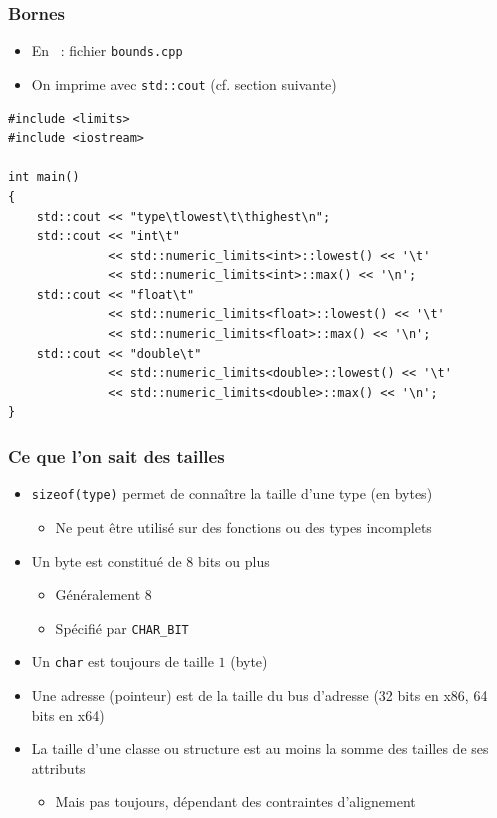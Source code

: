 \begin{frame}[containsverbatim]
\frametitle{Bornes}
\begin{itemize}
\item En \cpp\ : fichier \texttt{bounds.cpp}
\item On imprime avec \texttt{std::cout} (cf. section suivante)
\end{itemize}
\begin{lstlisting}
#include <limits>
#include <iostream>
 
int main() 
{
    std::cout << "type\tlowest\t\thighest\n";
    std::cout << "int\t"
              << std::numeric_limits<int>::lowest() << '\t'
              << std::numeric_limits<int>::max() << '\n';
    std::cout << "float\t"
              << std::numeric_limits<float>::lowest() << '\t'
              << std::numeric_limits<float>::max() << '\n';
    std::cout << "double\t"
              << std::numeric_limits<double>::lowest() << '\t'
              << std::numeric_limits<double>::max() << '\n';
}
\end{lstlisting}
\end{frame}

\begin{frame}
\frametitle{Ce que l'on sait des tailles}
\begin{itemize}[<+->]
\item \lstinline|sizeof(type)| permet de connaître la taille d'une type (en bytes)
	\begin{itemize}
	\item Ne peut être utilisé sur des fonctions ou des types incomplets
	\end{itemize}
\item Un byte est constitué de $8$ bits ou plus
	\begin{itemize}
	\item Généralement $8$
	\item Spécifié par \texttt{CHAR\_BIT}
	\end{itemize}
\item Un \lstinline|char| est toujours de taille $1$ (byte)
\item Une adresse (pointeur) est de la taille du bus d'adresse (32 bits en x86, 64 bits en x64)
\item La taille d'une classe ou structure est au moins la somme des tailles de ses attributs
	\begin{itemize}
	\item Mais pas toujours, dépendant des contraintes d'alignement
	\end{itemize}
\end{itemize}
\end{frame}

